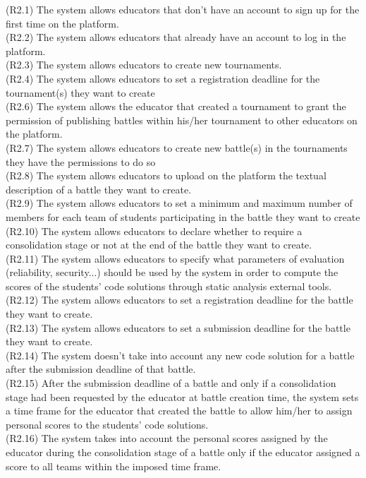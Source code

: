 (R2.1) The system allows educators that don’t have an account to sign up for the first time on the platform. \\
(R2.2) The system allows educators that already have an account to log in the platform. \\
(R2.3) The system allows educators to create new tournaments.  \\
(R2.4) The system allows educators to set a registration deadline for the tournament(s) they want to create  \\
(R2.6) The system allows the educator that created a tournament to grant the permission of publishing battles within his/her tournament to other educators on the platform. \\
(R2.7) The system allows educators to create new battle(s) in the tournaments they have the permissions to do so \\
(R2.8) The system allows educators to upload on the platform the textual description of a battle they want to create.  \\
(R2.9) The system allows educators to set a minimum and maximum number of members for each team of students participating in the battle they want to create  \\
(R2.10) The system allows educators to declare whether to require a consolidation stage or not at the end of the battle they want to create.  \\
(R2.11) The system allows educators to specify what parameters of evaluation (reliability, security...) should be used by the system in order to compute the scores of the students' code solutions through static analysis external tools.  \\
(R2.12) The system allows educators to set a registration deadline for the battle they want to create.  \\
(R2.13) The system allows educators to set a submission deadline for the battle they want to create.  \\
(R2.14) The system doesn't take into account any new code solution for a battle after the submission deadline of that battle.  \\
(R2.15) After the submission deadline of a battle and only if a consolidation stage had been requested by the educator at battle creation time, the system sets a time frame for the educator that created the battle to allow him/her to assign personal scores to the students’ code solutions.  \\
(R2.16) The system takes into account the personal scores assigned by the educator during the consolidation stage of a battle only if the educator assigned a score to all teams within the imposed time frame. \\
